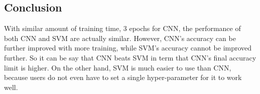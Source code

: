 \documentclass[paper=a4, fontsize=11pt]{scrartcl} %
\begin{document}
   		
   	\subsection*{Conclusion}
	With similar amount of training time, 3 epochs for CNN, the performance of both CNN and SVM are actually similar. However, CNN's accuracy can be further improved with more training, while SVM's accuracy cannot be improved further. So it can be say that CNN beats SVM in term that CNN's final accuracy limit is higher. On the other hand, SVM is much easier to use than CNN, because users do not even have to set a single hyper-parameter for it to work well.
    
\end{document}
